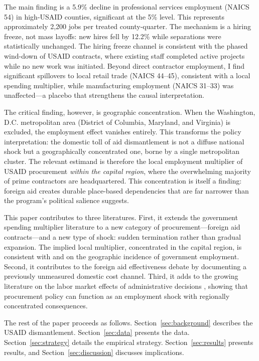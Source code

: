 \documentclass[12pt]{article}
\begin{document}
The main finding is a 5.9\% decline in professional services employment (NAICS 54) in high-USAID counties, significant at the 5\% level. This represents approximately 2,200 jobs per treated county-quarter. The mechanism is a hiring freeze, not mass layoffs: new hires fell by 12.2\% while separations were statistically unchanged. The hiring freeze channel is consistent with the phased wind-down of USAID contracts, where existing staff completed active projects while no new work was initiated. Beyond direct contractor employment, I find significant spillovers to local retail trade (NAICS 44--45), consistent with a local spending multiplier, while manufacturing employment (NAICS 31--33) was unaffected---a placebo that strengthens the causal interpretation.

The critical finding, however, is geographic concentration. When the Washington, D.C. metropolitan area (District of Columbia, Maryland, and Virginia) is excluded, the employment effect vanishes entirely. This transforms the policy interpretation: the domestic toll of aid dismantlement is not a diffuse national shock but a geographically concentrated one, borne by a single metropolitan cluster. The relevant estimand is therefore the local employment multiplier of USAID procurement \textit{within the capital region}, where the overwhelming majority of prime contractors are headquartered. This concentration is itself a finding: foreign aid creates durable place-based dependencies that are far narrower than the program's political salience suggests.

This paper contributes to three literatures. First, it extends the government spending multiplier literature \citep{nakamura2014fiscal, chodorowreich2019geographic, ramey2019ten} to a new category of procurement---foreign aid contracts---and a new type of shock: sudden termination rather than gradual expansion. The implied local multiplier, concentrated in the capital region, is consistent with \citet{moretti2010local} and \citet{shoag2010impact} on the geographic incidence of government employment. Second, it contributes to the foreign aid effectiveness debate \citep{burnside2000aid, easterly2003can, deaton2013great} by documenting a previously unmeasured domestic cost channel. Third, it adds to the growing literature on the labor market effects of administrative decisions \citep{autor2014contribution, dorn2024political}, showing that procurement policy can function as an employment shock with regionally concentrated consequences.

The rest of the paper proceeds as follows. Section~\ref{sec:background} describes the USAID dismantlement. Section~\ref{sec:data} presents the data. Section~\ref{sec:strategy} details the empirical strategy. Section~\ref{sec:results} presents results, and Section~\ref{sec:discussion} discusses implications.
\end{document}
